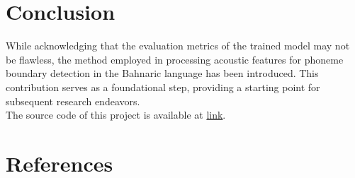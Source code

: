 \documentclass{article}
\begin{document}
\section{Conclusion}

While acknowledging that the evaluation metrics of the trained model may not be flawless, the method employed in processing acoustic features for phoneme boundary detection in the Bahnaric language has been introduced. This contribution serves as a foundational step, providing a starting point for subsequent research endeavors.\\[5mm]
The source code of this project is available at \href{https://github.com/tqtensor/bahnaric-phoneme}{link}.
\section{References}


\end{document}
